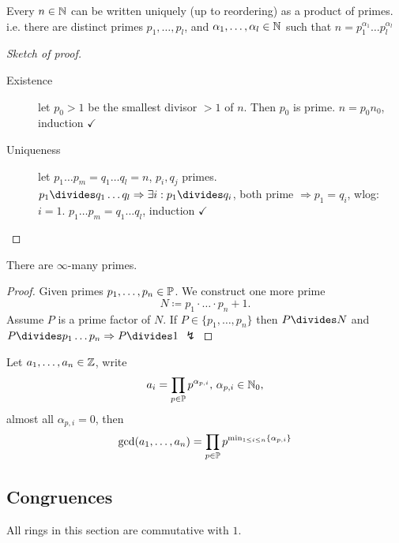 \documentclass[NumTh.tex]{subfiles}
\begin{document}
\begin{theorem}\label{th_0_2_2}
Every $n \in \mathbb{N}$ can be written uniquely (up to reordering) as a product of primes.
i.e. there are distinct primes $p_1,\dots,p_l$, and $\alpha_1,\dots,\alpha_l \in \mathbb{N}$ such that
$n = p_1^{\alpha_1} \dots p_l^{\alpha_l}$
\end{theorem}

\begin{proof}[Sketch of proof]\hfill{}
  \begin{description}
    \item[Existence]
      let $p_0 > 1$ be the smallest divisor $> 1$ of $n$. Then $p_0$ is prime.
      $n = p_0 n_0$, induction $\checkmark$

    \item[Uniqueness]
      let $p_1 \dots p_m = q_1 \dots q_l = n$, $p_i, q_j$ primes.
      $p_1 \divides  q_1 \dots q_l \Rightarrow \exists i: p_1\divides q_i$, both prime $\Rightarrow p_1 = q_i$, wlog: $i = 1$.
      $p_1\dots p_m = q_1 \dots q_l$, induction $\checkmark$
  \end{description}
\end{proof}

\begin{theorem}[Euclid]\label{th_0_2_3}
There are $\infty$-many primes.
\end{theorem}

\begin{proof}
  Given primes $p_1,\dots,p_n \in \mathbb{P}$. We construct one more prime \[N \coloneq p_1 \cdot \dots \cdot p_n + 1 \text{.}\]
  Assume $P$ is a prime factor of $N$.
  If $P \in \{p_1, \dots ,p_n\}$ then $P\divides N$ and $P\divides p_1\dots p_n \Rightarrow P\divides 1$ $\lightning$
\end{proof}

\begin{rem}
Let $a_1,\dots, a_n \in \mathbb{Z}$, write
\[a_i = \prod_{p \in \mathbb{P}} p^{\alpha_{p,i}}\text{, }\alpha_{p,i} \in \mathbb{N}_0 \text{,}\] almost all $\alpha_{p,i} = 0$,
then \[\gcd(a_1,\dots,a_n) = \prod_{p \in \mathbb{P}} p^{\min_{1\leq i\leq n} \{\alpha_{p,i}\}}\]
\end{rem}

\subsection{Congruences}

All rings in this section are commutative with $1$.
\end{document}
